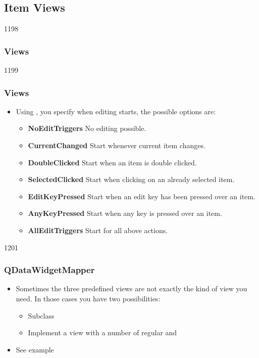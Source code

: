 \subsection{Item Views}
\begin{slide}{1198}\frametitle{Views}\label{model_view_views}
\vfill
{}
\vfill
\end{slide}

\begin{slide}{1199}\frametitle{Views}
\begin{itemize}
\item Using , you specify when
  editing starts, the possible options are:
  \begin{itemize}
    \item \textbf{NoEditTriggers} No editing possible.
    \item \textbf{CurrentChanged} Start whenever current item changes.
    \item \textbf{DoubleClicked} Start when an item is double clicked.
    \item \textbf{SelectedClicked} Start when clicking on an already selected item.
    \item \textbf{EditKeyPressed} Start when an edit key has been pressed over an item.
    \item \textbf{AnyKeyPressed} Start when any key is pressed over an item.
    \item \textbf{AllEditTriggers} Start for all above actions.
  \end{itemize}
\end{itemize}
\end{slide}

\begin{slide}{1201}\frametitle{QDataWidgetMapper}
\begin{itemize}
\item Sometimes the three predefined views are not exactly the kind of view
  you need. In those cases you have two possibilities:
  \begin{itemize}
  \item Subclass 
  \item Implement a view with a number of regular  and 
  \end{itemize}
\item See example 
\end{itemize}
\hfill{}\hfill{}\hfill\strut
\end{slide}


